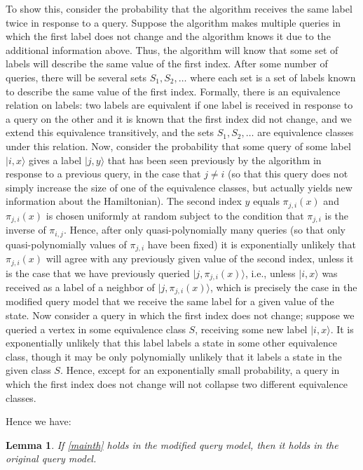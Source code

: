 \documentclass[letterpaper,onecolumn]{quantumarticle}
\newtheorem{lemma}{Lemma}
\begin{document}
To show this,
consider the probability that the algorithm receives the same label twice in response to a query.
Suppose the 
algorithm makes multiple queries in which the first label does not change and the algorithm knows it due to the additional information above.  Thus, the algorithm will know that some set of labels will describe the same value of the first index.
After some number of queries, there will be several sets $S_1,S_2,\ldots$ where each set is a set of labels known to describe the same value of the first index.  Formally, there is an equivalence relation on labels: two labels are equivalent if one label is received in response to a query on the other and it is known that the first index did not change, and we extend this equivalence transitively, and the sets $S_1,S_2,\ldots$ are equivalence classes under this relation.
Now, consider the probability that some query of some label $|i,x\rangle$ gives a label $|j,y\rangle$ that has been seen previously by the algorithm in response to a previous query, in the case that $j\neq i$ (so that this query does not simply increase the size of one of the equivalence classes, but actually yields new information about the Hamiltonian).
The second index $y$ equals $\pi_{j,i}(x)$ and $\pi_{j,i}(x)$ is chosen uniformly at random subject to the condition that $\pi_{j,i}$ is the inverse of $\pi_{i,j}$.  
Hence, after only quasi-polynomially many queries (so that only quasi-polynomially values of $\pi_{j,i}$ have been fixed) it is exponentially unlikely that $\pi_{j,i}(x)$ will agree with any previously given value of the second index, unless it is the case that
we have previously queried $|j,\pi_{j,i}(x)\rangle$, i.e., unless $|i,x\rangle$ was received as a label of a neighbor of $|j,\pi_{j,i}(x)\rangle$, which is precisely the case in the modified query model that we receive the same label for a given value of the
state.  Now consider a query in which the first index does not change;
suppose we queried a vertex in some equivalence class $S$, receiving some new label $|i,x\rangle$.   It is exponentially unlikely that this label labels a state in some other equivalence class, though it may be only polynomially unlikely that it labels a state in the given class $S$.  Hence, except for an exponentially small probability, a query in which the first index does not change will not collapse two different equivalence classes.


Hence we have:
\begin{lemma}
If  \cref{mainth} holds in the modified query model, then it holds in the original query model.
\end{lemma}
\end{document}
